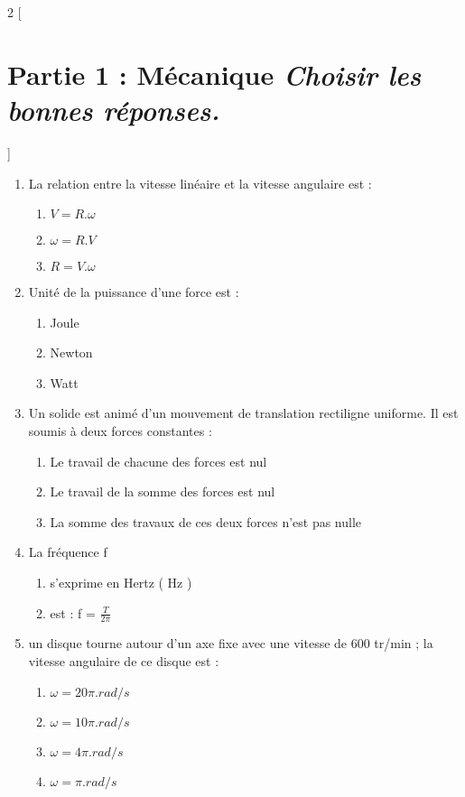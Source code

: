 \documentclass[12pt]{article}
\begin{document}
\vspace{-1cm}
\begin{multicols}{2}
    [
        \section*{Partie 1 : Mécanique \textit{Choisir les bonnes réponses.}}
] 

\begin{enumerate}
  \item La relation entre la vitesse linéaire et la vitesse angulaire est :
	  \vspace{-0.3cm}
      \begin{enumerate}
          \item $V = R.\omega$\sloppy
          \item $\omega = R.V$\nolinebreak
          \item $R = V.\omega$
      \end{enumerate}

  \item  Unité de la puissance d’une force est :
      \begin{enumerate}
          \item Joule 
		  \item Newton  
		  \item Watt
      \end{enumerate}


 \item  Un solide est animé d’un mouvement de translation rectiligne uniforme. Il est soumis à deux
forces constantes :
      \begin{enumerate}
          \item  Le travail de chacune des forces est nul 
          \item Le travail de la somme des forces est nul
          \item La somme des travaux de ces deux forces n’est pas nulle
      \end{enumerate}
  \item La fréquence f 
	  \begin{enumerate}
		  \item s’exprime en Hertz ( Hz )
		  \item est : f = $\frac{T}{2\pi}$
	  \end{enumerate}

  \item un disque tourne autour d’un axe fixe avec une vitesse de 600 tr/min ; la vitesse angulaire de ce disque est : 
  \begin{enumerate}
	  \item $\omega = 20\pi. rad/s$
	  \item $\omega = 10\pi. rad/s$
	  \item $\omega =4\pi. rad/s$
	  \item $\omega =\pi .rad/s$
  \end{enumerate}


\end{enumerate}
\end{multicols}
\end{document}
